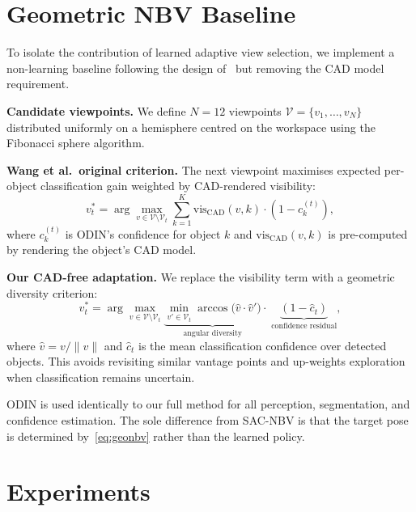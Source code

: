 \documentclass{article}
\begin{document}
\section{Geometric NBV Baseline}
\label{sec:baseline}

To isolate the contribution of learned adaptive view selection, we implement a non-learning baseline following the design of~\citet{wang2019active} but removing the CAD model requirement.

\textbf{Candidate viewpoints.} We define $N = 12$ viewpoints $\mathcal{V} = \{v_1, \ldots, v_N\}$ distributed uniformly on a hemisphere centred on the workspace using the Fibonacci sphere algorithm.

\textbf{Wang et al.\ original criterion.}
The next viewpoint maximises expected per-object classification gain weighted by CAD-rendered visibility:
\begin{equation}
  v^*_t = \arg\max_{v \in \mathcal{V} \setminus \mathcal{V}_t}
    \sum_{k=1}^K \mathrm{vis}_\text{CAD}(v, k) \cdot (1 - c_k^{(t)}),
  \label{eq:wang_original}
\end{equation}
where $c_k^{(t)}$ is ODIN's confidence for object $k$ and $\mathrm{vis}_\text{CAD}(v, k)$ is pre-computed by rendering the object's CAD model.

\textbf{Our CAD-free adaptation.}
We replace the visibility term with a geometric diversity criterion:
\begin{equation}
  v^*_t = \arg\max_{v \in \mathcal{V} \setminus \mathcal{V}_t}
    \underbrace{\min_{v' \in \mathcal{V}_t} \arccos\!\bigl(\hat{v} \cdot \hat{v}'\bigr)}_{\text{angular diversity}}
    \cdot\; \underbrace{(1 - \hat{c}_t)}_{\text{confidence residual}},
  \label{eq:geonbv}
\end{equation}
where $\hat{v} = v/\|v\|$ and $\hat{c}_t$ is the mean classification confidence over detected objects. This avoids revisiting similar vantage points and up-weights exploration when classification remains uncertain.

ODIN is used identically to our full method for all perception, segmentation, and confidence estimation. The sole difference from SAC-NBV is that the target pose is determined by~\eqref{eq:geonbv} rather than the learned policy.

\FloatBarrier
\section{Experiments}
\label{sec:experiments}
\end{document}
